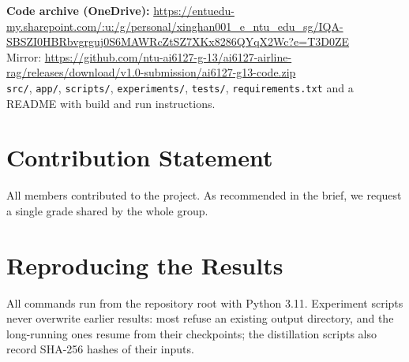 \documentclass[10pt,twocolumn,a4paper]{article}
\begin{document}
\textbf{Code archive (OneDrive):} \url{https://entuedu-my.sharepoint.com/:u:/g/personal/xinghan001_e_ntu_edu_sg/IQA-SBSZI0HBRbvgrguj0S6MAWRcZtSZ7XKx8286QYqX2Wc?e=T3D0ZE}\\
Mirror: \url{https://github.com/ntu-ai6127-g-13/ai6127-airline-rag/releases/download/v1.0-submission/ai6127-g13-code.zip}\\
\nolinkurl{src/}, \nolinkurl{app/}, \nolinkurl{scripts/}, \nolinkurl{experiments/}, \nolinkurl{tests/},
\nolinkurl{requirements.txt} and a README with build and run instructions.

\section*{Contribution Statement}
All members contributed to the project. As recommended in the brief, we request a single grade shared by the whole
group.

\printbibliography

\appendix
\onecolumn
\section{Reproducing the Results}
\label{app:repro}

All commands run from the repository root with Python 3.11. Experiment scripts never overwrite earlier results: most
refuse an existing output directory, and the long-running ones resume from their checkpoints; the distillation scripts
also record SHA-256 hashes of their inputs.
\end{document}

